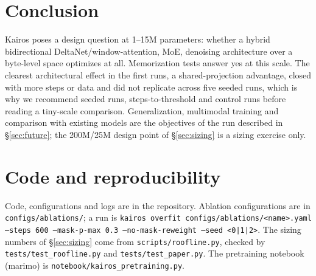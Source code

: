 \documentclass[11pt]{article}
\begin{document}
\section{Conclusion}

Kairos poses a design question at 1--15M parameters: whether a hybrid bidirectional
DeltaNet/window-attention, MoE, denoising architecture over a byte-level space optimizes at
all. Memorization tests answer yes at this scale. The clearest architectural effect in the first runs, a
shared-projection advantage, closed with more steps or data and did not replicate across five seeded runs,
which is why we recommend seeded runs, steps-to-threshold and control runs before reading a tiny-scale comparison. Generalization,
multimodal training and comparison with existing models are the objectives of the run described
in \S\ref{sec:future}; the 200M/25M design point of \S\ref{sec:sizing} is a sizing exercise only.

\section*{Code and reproducibility}

Code, configurations and logs are in the repository. Ablation configurations
are in \texttt{configs/ablations/}; a run is
\texttt{kairos overfit configs/ablations/<name>.yaml --steps 600 --mask-p-max 0.3
--no-mask-reweight --seed <0|1|2>}. The sizing numbers of \S\ref{sec:sizing} come from
\texttt{scripts/roofline.py}, checked by \texttt{tests/test\_roofline.py} and
\texttt{tests/test\_paper.py}. The pretraining notebook (marimo) is
\texttt{notebook/kairos\_pretraining.py}.



\end{document}
